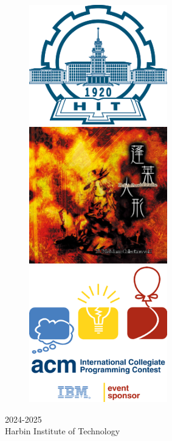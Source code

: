 \documentclass[10pt]{ctexart}
\def\university{Harbin Institute of Technology}
\def\season{2024-2025}
\begin{document}
\begin{titlepage}
    \begin{figure}[htbp]
        \centering
        \begin{minipage}[c]{0.25\textwidth}
            \centering
            \includegraphics[width=6cm]{utils/images/hit-logo.png}
        \end{minipage}
        \hspace{1cm}
        \begin{minipage}[c]{0.25\textwidth}
            \centering
            \includegraphics[width=6cm]{utils/images/hourai.jpg}
        \end{minipage}
        \hspace{1cm}
        \begin{minipage}[c]{0.25\textwidth}
            \centering
            \includegraphics[width=6cm]{utils/images/icpc.png}
        \end{minipage}
    \end{figure}

    \vfill

    \begin{center}
        \Large \color{darkgray} \season \\
        \Large \color{darkgray} \university
    \end{center}

    \vspace*{1cm}
\end{titlepage}
\end{document}
